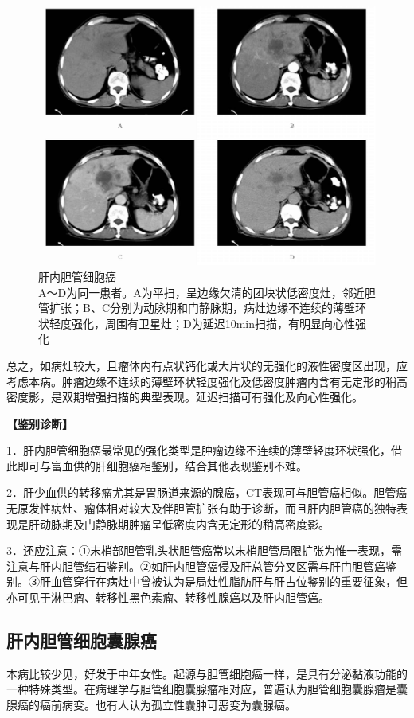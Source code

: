 \begin{figure}[!htbp]
 \centering
 \includegraphics[width=.7\textwidth,height=\textheight,keepaspectratio]{./images/Image00275.jpg}
 \captionsetup{justification=centering}
 \caption{肝内胆管细胞癌\\{\small A～D为同一患者。A为平扫，呈边缘欠清的团块状低密度灶，邻近胆管扩张；B、C分别为动脉期和门静脉期，病灶边缘不连续的薄壁环状轻度强化，周围有卫星灶；D为延迟10min扫描，有明显向心性强化}}
 \label{fig11-4}
  \end{figure} 

总之，如病灶较大，且瘤体内有点状钙化或大片状的无强化的液性密度区出现，应考虑本病。肿瘤边缘不连续的薄壁环状轻度强化及低密度肿瘤内含有无定形的稍高密度影，是双期增强扫描的典型表现。延迟扫描可有强化及向心性强化。

\textbf{【鉴别诊断】}

1．肝内胆管细胞癌最常见的强化类型是肿瘤边缘不连续的薄壁轻度环状强化，借此即可与富血供的肝细胞癌相鉴别，结合其他表现鉴别不难。

2．肝少血供的转移瘤尤其是胃肠道来源的腺癌，CT表现可与胆管癌相似。胆管癌无原发性病灶、瘤体相对较大及伴胆管扩张有助于诊断，而且肝内胆管癌的独特表现是肝动脉期及门静脉期肿瘤呈低密度内含无定形的稍高密度影。

3．还应注意：①末梢部胆管乳头状胆管癌常以末梢胆管局限扩张为惟一表现，需注意与肝内胆管结石鉴别。②如肝内胆管癌侵及肝总管分叉区需与肝门胆管癌鉴别。③肝血管穿行在病灶中曾被认为是局灶性脂肪肝与肝占位鉴别的重要征象，但亦可见于淋巴瘤、转移性黑色素瘤、转移性腺癌以及肝内胆管癌。

\subsection{肝内胆管细胞囊腺癌}

本病比较少见，好发于中年女性。起源与胆管细胞癌一样，是具有分泌黏液功能的一种特殊类型。在病理学与胆管细胞囊腺瘤相对应，普遍认为胆管细胞囊腺瘤是囊腺癌的癌前病变。也有人认为孤立性囊肿可恶变为囊腺癌。

